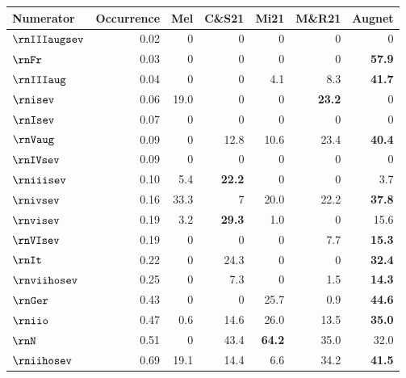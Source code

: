\begin{tabular}{lr|rrrrr}
Numerator & Occurrence & Mel  & C\&S21        & Mi21          & M\&R21        & Augnet        \\ \hline
$\rnIIIaugsev$     & 0.02       & 0    & 0             & 0             & 0             & 0             \\
$\rnFr$       & 0.03       & 0    & 0             & 0             & 0             & \textbf{57.9} \\
$\rnIIIaug$      & 0.04       & 0    & 0             & 4.1           & 8.3           & \textbf{41.7} \\
$\rnisev$        & 0.06       & 19.0 & 0             & 0             & \textbf{23.2} & 0             \\
$\rnIsev$        & 0.07       & 0    & 0             & 0             & 0             & 0             \\
$\rnVaug$        & 0.09       & 0    & 12.8          & 10.6          & 23.4          & \textbf{40.4} \\
$\rnIVsev$       & 0.09       & 0    & 0             & 0             & 0             & 0             \\
$\rniiisev$      & 0.10       & 5.4  & \textbf{22.2} & 0             & 0             & 3.7           \\
$\rnivsev$       & 0.16       & 33.3 & 7             & 20.0          & 22.2          & \textbf{37.8} \\
$\rnvisev$       & 0.19       & 3.2  & \textbf{29.3} & 1.0           & 0             & 15.6          \\
$\rnVIsev$       & 0.19       & 0    & 0             & 0             & 7.7           & \textbf{15.3} \\
$\rnIt$        & 0.22       & 0    & 24.3          & 0             & 0             & \textbf{32.4} \\
$\rnviihosev$     & 0.25       & 0    & 7.3           & 0             & 1.5           & \textbf{14.3} \\
$\rnGer$      & 0.43       & 0    & 0             & 25.7          & 0.9           & \textbf{44.6} \\
$\rniio$       & 0.47       & 0.6  & 14.6          & 26.0          & 13.5          & \textbf{35.0} \\
$\rnN$         & 0.51       & 0    & 43.4          & \textbf{64.2} & 35.0          & 32.0          \\
$\rniihosev$      & 0.69       & 19.1 & 14.4          & 6.6           & 34.2          & \textbf{41.5} \\

\end{tabular}
